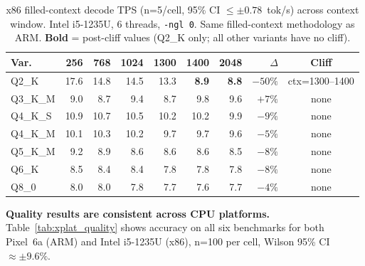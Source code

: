 \documentclass[conference]{IEEEtran}
\begin{document}
\begin{table}[h]
\centering
\caption{x86 filled-context decode TPS (n=5/cell, 95\% CI $\leq\pm0.78$~tok/s) across context window.
Intel i5-1235U, 6 threads, \texttt{-ngl~0}. Same filled-context methodology as ARM.
\textbf{Bold} = post-cliff values (Q2\_K only; all other variants have no cliff).}
\label{tab:x86_cliff}
\setlength{\tabcolsep}{3pt}
\footnotesize
\begin{tabular}{@{}lrrrrrrrc@{}}
\toprule
\textbf{Var.} & \textbf{256} & \textbf{768} & \textbf{1024} & \textbf{1300} & \textbf{1400} & \textbf{2048} & \textbf{$\Delta$} & \textbf{Cliff} \\
\midrule
Q2\_K    & 17.6 & 14.8 & 14.5 & 13.3 & \textbf{8.9}  & \textbf{8.8}  & $-50\%$ & ctx=1300--1400 \\
Q3\_K\_M &  9.0 &  8.7 &  9.4 &  8.7 &  9.8 &  9.6  & $+7\%$  & none \\
Q4\_K\_S & 10.9 & 10.7 & 10.5 & 10.2 & 10.2 &  9.9  & $-9\%$  & none \\
Q4\_K\_M & 10.1 & 10.3 & 10.2 &  9.7 &  9.7 &  9.6  & $-5\%$  & none \\
Q5\_K\_M &  9.2 &  8.9 &  8.6 &  8.6 &  8.6 &  8.5  & $-8\%$  & none \\
Q6\_K    &  8.5 &  8.4 &  8.4 &  7.8 &  7.8 &  7.8  & $-8\%$  & none \\
Q8\_0    &  8.0 &  8.0 &  7.8 &  7.7 &  7.6 &  7.7  & $-4\%$  & none \\
\bottomrule
\end{tabular}
\end{table}

\textbf{Quality results are consistent across CPU platforms.}
Table~\ref{tab:xplat_quality} shows accuracy on all six benchmarks for both
Pixel~6a (ARM) and Intel i5-1235U (x86), n=100 per cell, Wilson 95\% CI $\approx\pm9.6\%$.
\end{document}
